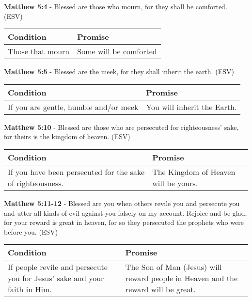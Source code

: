 \documentclass[11pt]{article}
\begin{document}
\textbf{Matthew 5:4} - Blessed are those who mourn, for they shall be comforted. (ESV)

\begin{center}
\begin{tabular}{ll}
Condition & Promise\\[0pt]
\hline
Those that mourn & Some will be comforted\\[0pt]
\end{tabular}
\end{center}

\textbf{Matthew 5:5} - Blessed are the meek, for they shall inherit the earth. (ESV)

\begin{center}
\begin{tabular}{ll}
Condition & Promise\\[0pt]
\hline
If you are gentle, humble and/or meek & You will inherit the Earth.\\[0pt]
\end{tabular}
\end{center}

\textbf{Matthew 5:10} - Blessed are those who are persecuted for righteousness' sake, for theirs is the kingdom of heaven. (ESV)

\begin{center}
\begin{tabular}{ll}
Condition & Promise\\[0pt]
\hline
If you have been persecuted for the sake of righteousness. & The Kingdom of Heaven will be yours.\\[0pt]
\end{tabular}
\end{center}

\textbf{Matthew 5:11-12} - Blessed are you when others revile you and persecute you and utter all kinds of evil against you falsely on my account. Rejoice and be glad, for your reward is great in heaven, for so they persecuted the prophets who were before you. (ESV)

\begin{center}
\begin{tabular}{ll}
Condition & Promise\\[0pt]
\hline
If people revile and persecute you for Jesus' sake and your faith in Him. & The Son of Man (Jesus) will reward people in Heaven and the reward will be great.\\[0pt]
\end{tabular}
\end{center}
\end{document}
